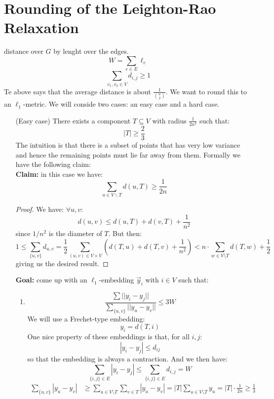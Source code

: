 \documentclass[11pt]{article}
\begin{document}
\section*{Rounding of the Leighton-Rao Relaxation}
distance over $G$ by lenght over the edges.
\[
    W = \sum_{e\in E} \ell_e
\]
\[
    \sum_{v_1, v_2\in V} d_{i,j} \geq 1
\]
Te above says that the average distance is about $\frac{1}{\binom{n}{2}}$. We want to round this to an $\ell_1$-metric. We will conside two cases: an easy case and a hard case.
\begin{itemize}
    \item[(Easy case)] There exists a component $T\subseteq V$ with radius $\frac{1}{2n^2}$ such that:
    \[
        |T| \geq \frac{2}{3}
    \]
    The intuition is that there is a subset of points that has very low variance and hence the remaining points must lie far away from them. Formally we have the following claim:\\
    \textbf{Claim:} in this case we have:
    \[
        \sum_{u \in V\backslash T} d(u,T)\geq \frac{1}{2n}
    \]
    \begin{proof}
        We have: $\forall u,v$:
        \[
            d(u,v)\leq d(u,T) + d(v,T) + \frac{1}{n^2}
        \]
        since $1/n^2$ is the diameter of $T$. But then:
        \[
            1 \leq \sum_{\{u,v\}} d_{u,v} = \frac{1}{2}\sum_{(u,v)\in V\times V} \left( d(T,u) + d(T,v) + \frac{1}{n^2}\right) < n \cdot \sum_{w \in V \setminus T}d(T,w) + \frac{1}{2}
        \]
        giving us the desired result.
    \end{proof}
    \textbf{Goal:} come up with an $\ell_1$-embedding $\vec{y}_i$ with $i\in V$ such that:
    \begin{enumerate}
        \item \[\frac{\sum ||y_i - y_j ||}{\sum_{\{u,v\}}||y_u - y_v||} \leq 3W
        \]
        We will use a Frechet-type embedding:
        \[
            y_i = d(T,i)
        \]
        One nice property of these embeddings is that, for all $i,j$:
        \[
            |y_i - y_j| \leq d_{ij}
        \]
        so that the embedding is always a contraction. And we then have:
        \[
            \sum_{\{i,j\}\in E}|y_i - y_j|\leq \sum_{\{i,j\}\in E} d_{i,j} = W
        \]
        \begin{align*}
        \sum_{\{u,v\}} |y_u - y_v| &\geq  \sum_{u \in V \setminus T}\sum_{v \in T}|y_u - y_v| = |T| \sum_{u \in V \setminus T}y_u = |T|\cdot \frac{1}{2n}\geq \frac{1}{3}

\end{align*}
\end{enumerate}
\end{itemize}
\end{document}
